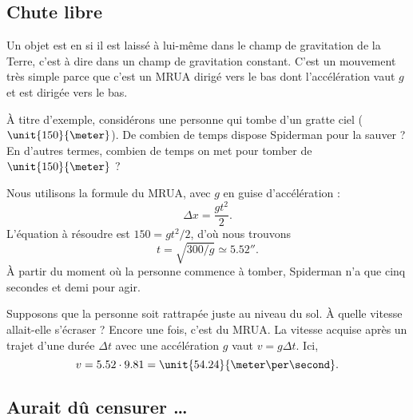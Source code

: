 \subsection{Chute libre}

Un objet est en  si il est laissé à lui-même dans le champ de gravitation de la Terre, c'est à dire dans un champ de gravitation constant. C'est un mouvement très simple parce que c'est un MRUA dirigé vers le bas dont l'accélération vaut $g$ et est dirigée vers le bas.

À titre d'exemple, considérons une personne qui tombe d'un gratte ciel ($\unit{150}{\meter}$). De combien de temps dispose Spiderman pour la sauver ? En d'autres termes, combien de temps on met pour tomber de $\unit{150}{\meter}$ ?

Nous utilisons la formule du MRUA, avec $g$ en guise d'accélération :
\begin{equation}
	\Delta x=\frac{ gt^2 }{ 2 }.
\end{equation}
L'équation à résoudre est $150=gt^2/2$, d'où nous trouvons
\begin{equation}
	t=\sqrt{300/g}\simeq \unit{5.52}{\second}.
\end{equation}
À partir du moment où la personne commence à tomber, Spiderman n'a que cinq secondes et demi pour agir.

Supposons que la personne soit rattrapée juste au niveau du sol. À quelle vitesse allait-elle s'écraser ? Encore une fois, c'est du MRUA. La vitesse acquise après un trajet d'une durée $\Delta t$ avec une accélération $g$ vaut $v=g\Delta t$. Ici,
\begin{equation}
	v=5.52\cdot 9.81=\unit{54.24}{\meter\per\second}.
\end{equation}

\subsection{Aurait dû censurer \ldots}

